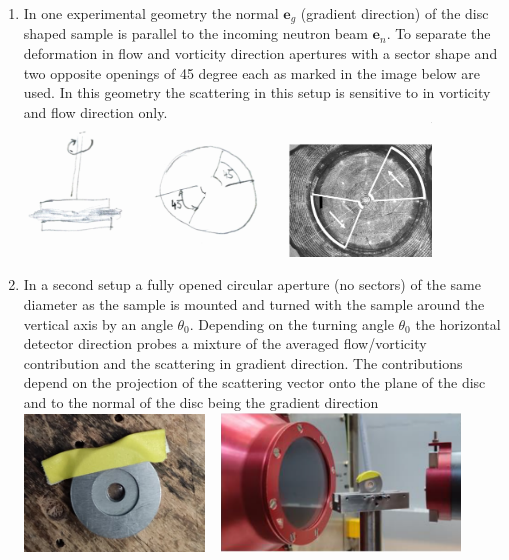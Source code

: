 \begin{enumerate}
\item In one experimental geometry the normal $\mathbf{e}_g$ (gradient direction) of the disc shaped sample is parallel to the incoming neutron beam $\mathbf{e}_n$. To separate the deformation in flow and vorticity direction apertures with a sector shape and two opposite openings of 45 degree each as marked in the image below are used. In this geometry the scattering in this setup is sensitive to in vorticity and flow direction only.\\[3mm]

    \includegraphics[width=0.85\textwidth]{../images/form_factor/deformed_sheared/sample1.png} \\

\item In a second setup a fully opened circular aperture (no sectors) of the same diameter as the sample is mounted and turned with the sample around the vertical axis by an angle $\theta_0$. Depending on the turning angle $\theta_0$ the horizontal detector direction probes a mixture of the averaged flow/vorticity contribution and the scattering in gradient direction. The contributions depend on the projection of the scattering vector onto the plane of the disc and to the normal of the disc being the gradient direction \\[3mm]

   \noindent  \includegraphics[width=0.377\textwidth]{../images/form_factor/deformed_sheared/mag_tilted_sample.pdf} ~
    \includegraphics[width=0.5\textwidth]{../images/form_factor/deformed_sheared/tilted_sample.pdf} \\

\end{enumerate}

